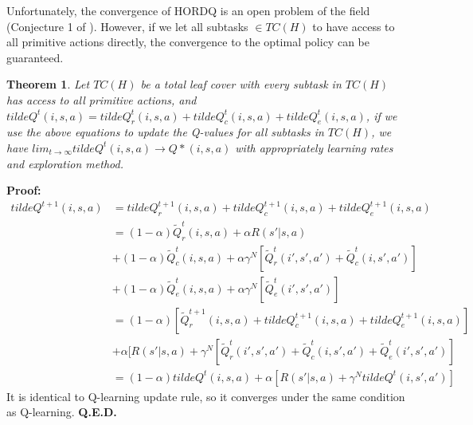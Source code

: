 \documentclass{article} %
\newtheorem{theorem}{Theorem}
\begin{document}
Unfortunately, the convergence of HORDQ is an open problem of the field (Conjecture 1 of \cite{HORDQ}).
However, if we let all subtasks $\in TC(H)$ to have access to all primitive actions directly, 
the convergence to the optimal policy can be guaranteed. 
\begin{theorem}
    Let $TC(H)$ be a total leaf cover with every subtask in $TC(H)$ has access to all primitive actions, and $tilde{Q}^t(i, s, a) = tilde{Q}_r^t(i, s, a) + tilde{Q}_c^t(i, s, a) + tilde{Q}_e^t(i, s, a)$, if we use the above equations to update the Q-values for all subtasks in $TC(H)$, 
    we have $lim_{t \rightarrow \infty} tilde{Q}^t(i, s, a) \rightarrow Q*(i, s, a)$ with appropriately
    learning rates and exploration method.
 
\end{theorem}
\textbf{Proof:} 
\begin{align*}
    tilde{Q}^{t+1}(i, s, a) &= tilde{Q}_r^{t+1}(i, s, a) + tilde{Q}_c^{t+1}(i, s, a) + tilde{Q}_e^{t+1}(i, s, a) \\
                        &=(1 - \alpha)\tilde{Q}_r^{t}(i, s, a) + \alpha R(s'| s, a)\\
                        &+(1 - \alpha)\tilde{Q}_c^{t}(i, s, a) + \alpha \gamma^N[\tilde{Q}_r^{t}(i', s', a') + \tilde{Q}_c^t(i, s', a')]\\
                        &+(1 - \alpha)\tilde{Q}_e^{t}(i, s, a) + \alpha \gamma^N[\tilde{Q}_e^{t}(i', s', a')]\\
                        &=(1 - \alpha)[\tilde{Q}_r^{t+1}(i, s, a) + tilde{Q}_c^{t+1}(i, s, a) + tilde{Q}_e^{t+1}(i, s, a)]\\
                        &+\alpha[ R(s'| s, a) + \gamma^N[\tilde{Q}_r^{t}(i', s', a') + \tilde{Q}_c^t(i, s', a') + \tilde{Q}_e^{t}(i', s', a')] \\
                        &=(1 - \alpha) tilde{Q}^{t}(i, s, a) + \alpha[ R(s'| s, a) + \gamma^N  tilde{Q}^{t}(i, s', a') ]
\end{align*}
    It is identical to Q-learning update rule, so it converges under the same condition as Q-learning. \textbf{Q.E.D.}
\end{document}
